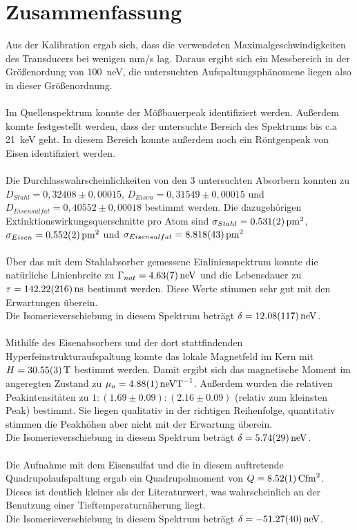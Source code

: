 \documentclass[12pt,a4paper]{article}
\begin{document}
\section{Zusammenfassung}
Aus der Kalibration ergab sich, dass die verwendeten Maximalgeschwindigkeiten des Transducers bei wenigen mm/s lag. Daraus ergibt sich ein Messbereich in der Größenordung von \SI{100}{neV}, die untersuchten Aufspaltungsphänomene liegen also in dieser Größenordnung.\\
\\
Im Quellenspektrum konnte der Mößbauerpeak identifiziert werden. Außerdem konnte festgestellt werden, dass der untersuchte Bereich des Spektrums bis c.a \SI{21}{keV} geht. In diesem Bereich konnte außerdem noch ein Röntgenpeak von Eisen identifiziert werden.\\
\\
Die Durchlasswahrscheinlichkeiten von den 3 untersuchten Absorbern konnten zu $D_{Stahl} = 0,32408 \pm 0,00015$, $D_{Eisen} = 0,31549 \pm 0,00015$ und $D_{Eisensulfat} = 0,40552 \pm 0,00018$ bestimmt werden. Die dazugehörigen Extinktionswirkungsquerschnitte pro Atom sind $\sigma_{Stahl} = \SI{0.531\pm 0.002}{pm^2}$, $\sigma_{Eisen} = \SI{0.552\pm 0.002}{pm^2}$ und $\sigma_{Eisensulfat} = \SI{8.818\pm 0.043}{pm^2}$\\
\\
Über das mit dem Stahlabsorber gemessene Einlinienspektrum konnte die natürliche Linienbreite zu $\Gamma_{nat} = \SI{4.63\pm 0.07}{neV}$ und die Lebensdauer zu $\tau = \SI{142.22\pm2.16}{ns}$ bestimmt werden. Diese Werte stimmen sehr gut mit den Erwartungen überein.\\
Die Isomerieverschiebung in diesem Spektrum beträgt $\delta = \SI{12.08\pm 1.17}{neV}$.\\
\\
Mithilfe des Eisenabsorbers und der dort stattfindenden Hyperfeinstrukturaufspaltung konnte das lokale Magnetfeld im Kern mit $H = \SI{30.55\pm 0.03}{T}$ bestimmt werden. Damit ergibt sich das magnetische Moment im angeregten Zustand zu $\mu_a = \SI{4.88\pm 0.01}{neVT^{-1}}$. Außerdem wurden die relativen Peakintensitäten zu $1:(1.69\pm0.09):(2.16\pm0.09)$ (relativ zum kleinsten Peak) bestimmt. Sie liegen qualitativ in der richtigen Reihenfolge, quantitativ stimmen die Peakhöhen aber nicht mit der Erwartung überein.\\
Die Isomerieverschiebung in diesem Spektrum beträgt $\delta = \SI{5.74\pm 0.29}{neV}$.\\
\\
Die Aufnahme mit dem Eisensulfat und die in diesem auftretende Quadrupolaufspaltung ergab ein Quadrupolmoment von $Q = \SI{8.52\pm 0.01}{Cfm^2}$. Dieses ist deutlich kleiner als der Literaturwert, was wahrscheinlich an der Benutzung einer Tieftemperaturnäherung liegt.\\
Die Isomerieverschiebung in diesem Spektrum beträgt $\delta = \SI{-51.27\pm 0.40}{neV}$.\\
\end{document}
